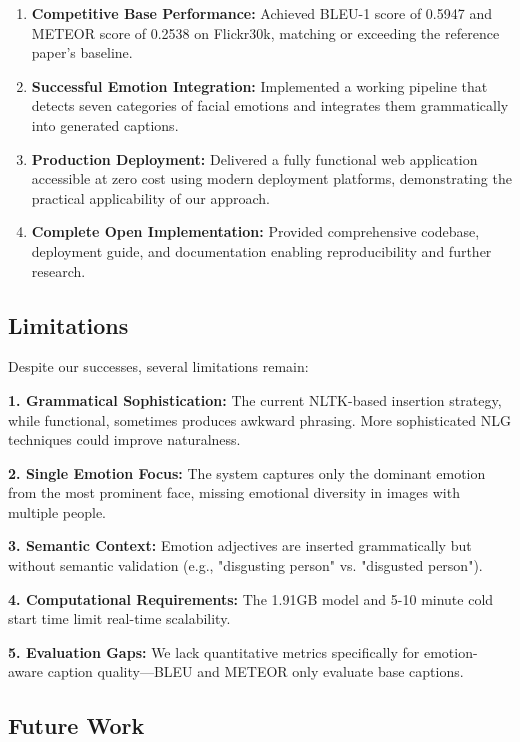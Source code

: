 \documentclass[12pt]{article}
\begin{document}
\begin{enumerate}
\item \textbf{Competitive Base Performance:} Achieved BLEU-1 score of 0.5947 and METEOR score of 0.2538 on Flickr30k, matching or exceeding the reference paper's baseline.

\item \textbf{Successful Emotion Integration:} Implemented a working pipeline that detects seven categories of facial emotions and integrates them grammatically into generated captions.

\item \textbf{Production Deployment:} Delivered a fully functional web application accessible at zero cost using modern deployment platforms, demonstrating the practical applicability of our approach.

\item \textbf{Complete Open Implementation:} Provided comprehensive codebase, deployment guide, and documentation enabling reproducibility and further research.
\end{enumerate}

\subsection{Limitations}

Despite our successes, several limitations remain:

\textbf{1. Grammatical Sophistication:}
The current NLTK-based insertion strategy, while functional, sometimes produces awkward phrasing. More sophisticated NLG techniques could improve naturalness.

\textbf{2. Single Emotion Focus:}
The system captures only the dominant emotion from the most prominent face, missing emotional diversity in images with multiple people.

\textbf{3. Semantic Context:}
Emotion adjectives are inserted grammatically but without semantic validation (e.g., "disgusting person" vs. "disgusted person").

\textbf{4. Computational Requirements:}
The 1.91GB model and 5-10 minute cold start time limit real-time scalability.

\textbf{5. Evaluation Gaps:}
We lack quantitative metrics specifically for emotion-aware caption quality—BLEU and METEOR only evaluate base captions.

\subsection{Future Work}
\end{document}
